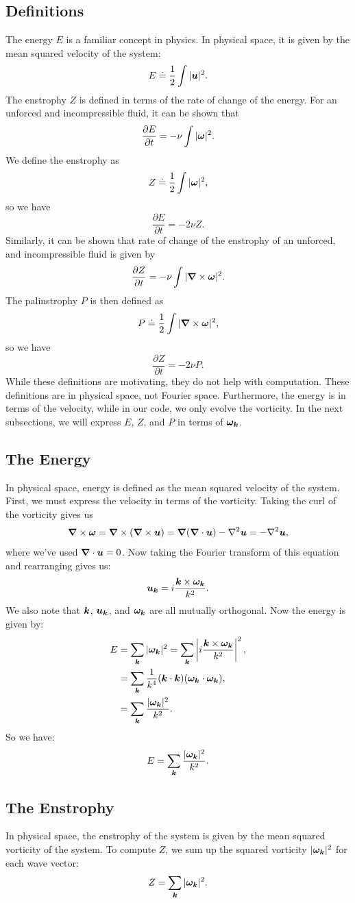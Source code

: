 \documentclass[12pt]{article}
\def\v{\bm}
\def\vw{{\v\w}}
\begin{document}
\subsection{Definitions}
The energy $E$ is a familiar concept in physics. In physical space, it is given by the mean squared velocity of the system:
$$
E\doteq \frac{1}{2} \int |\vu|^2.
$$
The enstrophy $Z$ is defined in terms of the rate of change of the energy. For an unforced and incompressible fluid, it can be shown \cite{frisch95} that
$$
\frac{\partial E}{\partial t} = -\nu \int |\vw|^2.
$$
We define the enstrophy as
$$
Z\doteq\frac{1}{2}\int |\vw|^2,
$$
so we have
$$
\frac{\partial E}{\partial t} = -2\nu Z.
$$
Similarly, it can be shown \cite{frisch95} that rate of change of the enstrophy of an unforced, and incompressible fluid is given by
$$
\frac{\partial Z}{\partial t} = -\nu \int |\grad\times \vw|^2.
$$
The palinstrophy $P$ is then defined as
$$
P\doteq\frac{1}{2}\int |\grad \times \vw|^2,
$$
so we have
$$
\frac{\partial Z}{\partial t} = -2\nu P.
$$
While these definitions are motivating, they do not help with computation. These definitions are in physical space, not Fourier space. Furthermore, the energy is in terms of the velocity, while in our code, we only evolve the vorticity. In the next subsections, we will express $E$, $Z$, and $P$ in terms of $\vw_\vk$.
\subsection{The Energy}
In physical space, energy is defined as the mean squared velocity of the system. First, we must express the velocity in terms of the vorticity. Taking the curl of the vorticity gives us
$$\grad \times \vw = \grad \times(\grad \times \vu) = \grad(\grad\cdot \vu)- {\nabla}^2 \vu = - {\nabla}^2 \vu,$$
where we've used $\grad\cdot \vu = 0$. Now taking the Fourier transform of this equation and rearranging gives us:
$$\vu_\vk = i \frac{\vk\times \vw_\vk}{k^2}. $$
We also note that $\vk$, $\vu_\vk$, and $\vw_\vk$ are all mutually orthogonal. Now the energy is given by:
\begin{align*}
E &= \sum_{\vk} |\vw_\vk|^2 = \sum_{\vk} \left|i \frac{\vk\times \vw_\vk}{k^2} \right|^2,\\
& =\sum_{\vk}\frac{1}{k^4}(\vk\cdot \vk ) (\vw_\vk\cdot \vw_\vk)  , \\
& = \sum_{\vk}\frac{|\vw_\vk|^2}{k^2}.
\end{align*}
So we have:
$$E = \sum_{\vk}\frac{|\vw_\vk|^2}{k^2}.$$
\subsection{The Enstrophy}
In physical space, the enstrophy of the system is given by the mean squared vorticity of the system. To compute $Z$, we sum up the squared vorticity $|\vw_\vk|^2$ for each wave vector:
$$ Z = \sum_{\vk} |\vw_\vk|^2.$$
\end{document}

